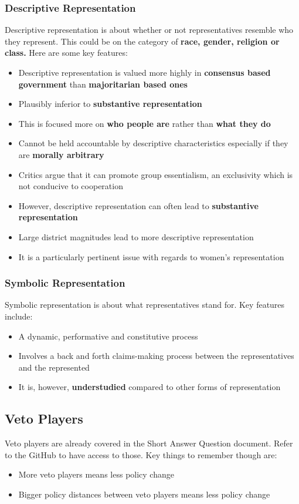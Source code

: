 \documentclass[12pt, letterpaper]{article}
\begin{document}
\subsubsection{Descriptive Representation}
Descriptive representation is about whether or not representatives resemble who they represent. This could be on the category of \textbf{race, gender, religion or class.} Here are some key features:
\begin{itemize}
	\item Descriptive representation is valued more highly in \textbf{consensus based government} than \textbf{majoritarian based ones}
	\item Plausibly inferior to \textbf{substantive representation}
	\item This is focused more on \textbf{who people are} rather than \textbf{what they do}
	\item Cannot be held accountable by descriptive characteristics especially if they are \textbf{morally arbitrary}
	\item Critics argue that it can promote group essentialism, an exclusivity which is not conducive to cooperation
	\item However, descriptive representation can often lead to \textbf{substantive representation}
	\item Large district magnitudes lead to more descriptive representation
	\item It is a particularly pertinent issue with regards to women's representation
\end{itemize}

\subsubsection{Symbolic Representation}
Symbolic representation is about what representatives stand for. Key features include:
\begin{itemize}
	\item A dynamic, performative and constitutive process
	\item Involves a back and forth claims-making process between the representatives and the represented
	\item It is, however, \textbf{understudied} compared to other forms of representation
\end{itemize}

\subsection{Veto Players}
Veto players are already covered in the Short Answer Question document. Refer to the GitHub to have access to those. Key things to remember though are:
\begin{itemize}
	\item More veto players means less policy change
	\item Bigger policy distances between veto players means less policy change
\end{itemize}
\end{document}
